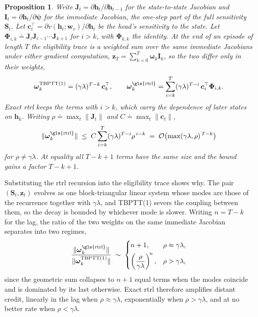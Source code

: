 \documentclass{article}
\newtheorem{proposition}{Proposition}
\begin{document}
\begin{proposition}
\label{prop:composition}
Write $\boldsymbol{J}_t = \partial \boldsymbol{h}_t / \partial \boldsymbol{h}_{t-1}$ for the
state-to-state Jacobian and
$\boldsymbol{I}_t = \partial \boldsymbol{h}_t / \partial \boldsymbol{\psi}$ for the immediate
Jacobian, the one-step part of the full sensitivity $\boldsymbol{S}_t$. Let
$\boldsymbol{c}_t^\top = \partial v(\boldsymbol{h}_t;\boldsymbol{w}_v) / \partial \boldsymbol{h}_t$
be the head's sensitivity to the state. Let
$\boldsymbol{\Phi}_{i,k} \doteq \boldsymbol{J}_i \boldsymbol{J}_{i-1}\cdots\boldsymbol{J}_{k+1}$
for $i > k$, with $\boldsymbol{\Phi}_{k,k}$ the identity.
At the end of an episode of length $T$ the eligibility trace is a weighted sum over the same
immediate Jacobians under either gradient computation,
$\boldsymbol{z}_T = \sum_{k=0}^{T} \boldsymbol{\omega}_k \boldsymbol{I}_k$, so the two differ only
in their weights,
\begin{equation}
    \boldsymbol{\omega}_k^{\mathrm{TBPTT(1)}} = (\gamma\lambda)^{T-k}\, \boldsymbol{c}_k^\top,
    \qquad
    \boldsymbol{\omega}_k^{\mathrm{\gls{rtrl}}}
    = \sum_{i=k}^{T} (\gamma\lambda)^{T-i}\, \boldsymbol{c}_i^\top \boldsymbol{\Phi}_{i,k}.
\end{equation}
Exact \gls{rtrl} keeps the terms with $i > k$, which carry the dependence of later states on
$\boldsymbol{h}_k$. Writing $\rho \doteq \max_t \|\boldsymbol{J}_t\|$ and
$C \doteq \max_t \|\boldsymbol{c}_t\|$,
\begin{equation}
    \|\boldsymbol{\omega}_k^{\mathrm{\gls{rtrl}}}\|
    \;\le\; C \sum_{i=k}^{T} (\gamma\lambda)^{T-i} \rho^{\,i-k}
    \;=\; \mathcal{O}\!\left(\max(\gamma\lambda,\rho)^{\,T-k}\right)
\end{equation}
for $\rho \neq \gamma\lambda$. At equality all $T-k+1$ terms have the same size and the bound
gains a factor $T-k+1$.
\end{proposition}

Substituting the \gls{rtrl} recursion into the eligibility trace shows why. The pair
$(\boldsymbol{S}_t, \boldsymbol{z}_t)$ evolves as one block-triangular linear system whose modes
are those of the recurrence together with $\gamma\lambda$, and TBPTT(1) severs the coupling
between them, so the decay is bounded by whichever mode is slower. Writing $n = T-k$ for the lag,
the ratio of the two weights on the same immediate Jacobian separates into two regimes,
\begin{equation}
    \frac{\|\boldsymbol{\omega}_k^{\mathrm{\gls{rtrl}}}\|}
         {\|\boldsymbol{\omega}_k^{\mathrm{TBPTT(1)}}\|}
    \;\sim\;
    \begin{cases}
        n + 1, & \rho \approx \gamma\lambda, \\[4pt]
        \left(\dfrac{\rho}{\gamma\lambda}\right)^{\!n}, & \rho > \gamma\lambda,
    \end{cases}
    \label{eq:amplification}
\end{equation}
since the geometric sum collapses to $n+1$ equal terms when the modes coincide and is dominated
by its last otherwise. Exact \gls{rtrl} therefore amplifies distant credit, linearly in the lag
when $\rho \approx \gamma\lambda$, exponentially when $\rho > \gamma\lambda$, and at no better
rate when $\rho < \gamma\lambda$.
\end{document}
